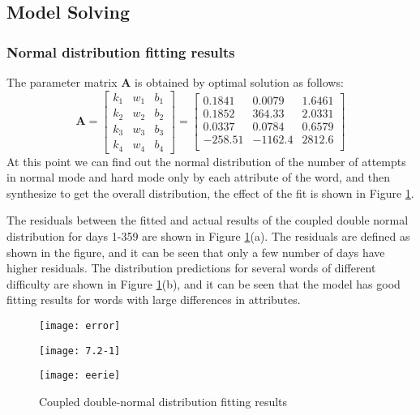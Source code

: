\documentclass[12pt]{mcmthesis}
\begin{document}
\subsection{Model Solving}
\subsubsection{Normal distribution fitting results}
\hspace{1.4em}The parameter matrix $ \boldsymbol{A} $ is obtained by optimal solution as follows:
\begin{equation}\label{eq:6}
	\boldsymbol{A}=\left[\begin{array}{lllll}
		k_1 & w_{1} & b_1  \\
		k_2 & w_{2} & b_2 \\
		k_3 & w_{3} & b_3 \\
		k_4 & w_{4} & b_4
	\end{array}\right]
=
\left[ \begin{matrix}
	0.1841&		0.0079&		1.6461\\
	0.1852&		364.33&		2.0331\\
	0.0337&		0.0784&		0.6579\\
	-258.51&		-1162.4&		2812.6\\
\end{matrix} \right] 
\end{equation}
At this point we can find out the normal distribution of the number of attempts in normal mode and hard mode only by each attribute of the word, and then synthesize to get the overall distribution, the effect of the fit is shown in Figure \ref{fig:7}.

The residuals between the fitted and actual results of the coupled double normal distribution for days 1-359 are shown in Figure \ref{fig:7}(a). The residuals are defined as shown in the figure, and it can be seen that only a few number of days have higher residuals. The distribution predictions for several words of different difficulty are shown in Figure \ref{fig:7}(b), and it can be seen that the model has good fitting results for words with large differences in attributes.
\begin{figure}[h]
	\centering
	\begin{minipage}[c]{1\textwidth}
		\centering
		\texttt{[image: error]}
		\label{fig7_1}
	\end{minipage}
	\begin{minipage}[c]{0.52\textwidth}
		\centering
		\texttt{[image: 7.2-1]}
		\label{fig7_2}
	\end{minipage}
	\begin{minipage}[c]{0.43\textwidth}
	\centering
	\texttt{[image: eerie]}
	\label{fig7_3}
\end{minipage}
	\caption{Coupled double-normal distribution fitting results}
	\label{fig:7}
\end{figure}
\end{document}
